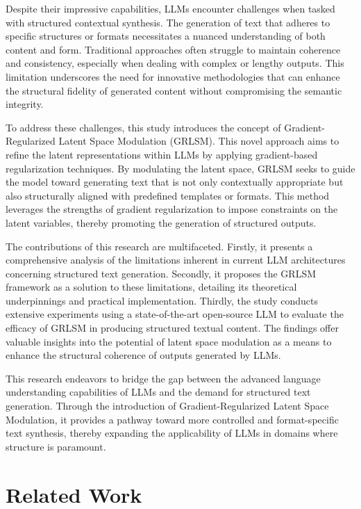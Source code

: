 \documentclass{article}
\begin{document}
Despite their impressive capabilities, LLMs encounter challenges when tasked with structured contextual synthesis. The generation of text that adheres to specific structures or formats necessitates a nuanced understanding of both content and form. Traditional approaches often struggle to maintain coherence and consistency, especially when dealing with complex or lengthy outputs. This limitation underscores the need for innovative methodologies that can enhance the structural fidelity of generated content without compromising the semantic integrity.

To address these challenges, this study introduces the concept of Gradient-Regularized Latent Space Modulation (GRLSM). This novel approach aims to refine the latent representations within LLMs by applying gradient-based regularization techniques. By modulating the latent space, GRLSM seeks to guide the model toward generating text that is not only contextually appropriate but also structurally aligned with predefined templates or formats. This method leverages the strengths of gradient regularization to impose constraints on the latent variables, thereby promoting the generation of structured outputs.

The contributions of this research are multifaceted. Firstly, it presents a comprehensive analysis of the limitations inherent in current LLM architectures concerning structured text generation. Secondly, it proposes the GRLSM framework as a solution to these limitations, detailing its theoretical underpinnings and practical implementation. Thirdly, the study conducts extensive experiments using a state-of-the-art open-source LLM to evaluate the efficacy of GRLSM in producing structured textual content. The findings offer valuable insights into the potential of latent space modulation as a means to enhance the structural coherence of outputs generated by LLMs.

This research endeavors to bridge the gap between the advanced language understanding capabilities of LLMs and the demand for structured text generation. Through the introduction of Gradient-Regularized Latent Space Modulation, it provides a pathway toward more controlled and format-specific text synthesis, thereby expanding the applicability of LLMs in domains where structure is paramount.


\section{Related Work}
\end{document}
